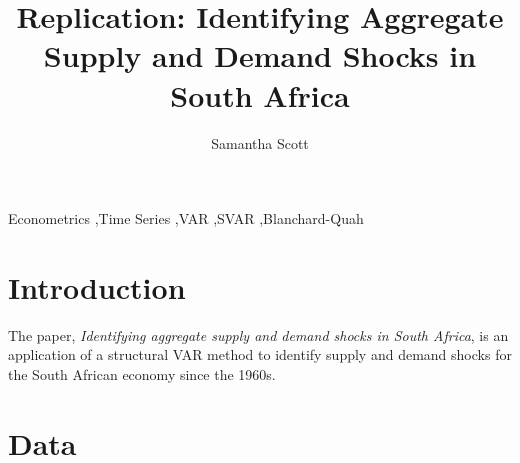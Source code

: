 \documentclass[11pt,preprint, authoryear]{elsarticle}
\numberwithin{equation}{section}
\numberwithin{figure}{section}
\numberwithin{table}{section}
\begin{document}
\begin{frontmatter}  %

\title{Replication: Identifying Aggregate Supply and Demand Shocks in
South Africa}





\author[Add1]{Samantha Scott}





\address[Add1]{Stellenbosch University, Cape Town, South Africa}



\vspace{1cm}


\begin{keyword}
\footnotesize{
Econometrics \sep Time Series \sep VAR \sep SVAR \sep Blanchard-Quah \\
\vspace{0.3cm}
}
\end{keyword}



\vspace{0.5cm}

\end{frontmatter}



\pagestyle{fancy}
\chead{}
\rhead{}
\lfoot{}
\lhead{}
\cfoot{}


\headsep 35pt %




\hypertarget{introduction}{%
\section{Introduction}\label{introduction}}

The paper, \emph{Identifying aggregate supply and demand shocks in South
Africa}, is an application of a structural VAR method to identify supply
and demand shocks for the South African economy since the 1960s.

\hypertarget{data}{%
\section{Data}\label{data}}
\end{document}
